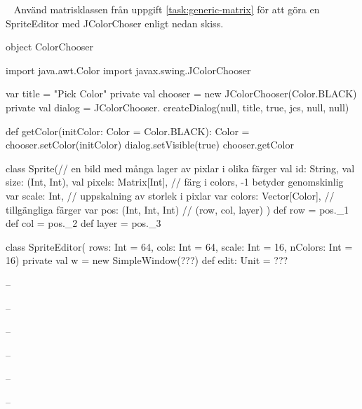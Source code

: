 \QUESTEND


\clearpage


\QUESTBEGIN

\Task  \what~ Använd matrisklassen från uppgift \ref{task:generic-matrix} för att göra en SpriteEditor med JColorChoser enligt nedan skiss.

\begin{Code}
object ColorChooser {
  import java.awt.Color
  import javax.swing.JColorChooser

  var title = "Pick Color"
  private val chooser = new JColorChooser(Color.BLACK)
  private val dialog = JColorChooser.
    createDialog(null, title, true, jcs, null, null)

  def getColor(initColor: Color = Color.BLACK): Color = {
    chooser.setColor(initColor)
    dialog.setVisible(true)
    chooser.getColor
  }
}

class Sprite(// en bild med många lager av pixlar i olika färger
  val id: String,
  val size: (Int, Int),
  val pixels: Matrix[Int],   // färg i colors, -1 betyder genomskinlig
  var scale: Int,            // uppskalning av storlek i pixlar
  var colors: Vector[Color], // tillgängliga färger
  var pos: (Int, Int, Int)   // (row, col, layer)
){
  def row = pos._1
  def col = pos._2
  def layer = pos._3
}

class SpriteEditor(
    rows: Int = 64, cols: Int = 64,
    scale: Int = 16, nColors: Int = 16) {
  private val w = new SimpleWindow(???)
  def edit: Unit = ???
}

\end{Code}



\SOLUTION


\TaskSolved \what

\SubtaskSolved  -- %

\SubtaskSolved  -- %

\SubtaskSolved  -- %

\SubtaskSolved  -- %

\SubtaskSolved  -- %

\SubtaskSolved  -- %



\QUESTEND











